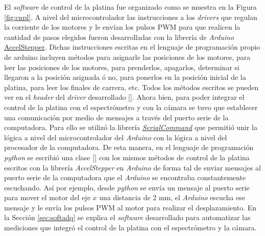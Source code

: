 El \textit{software} de control de la platina fue organizado como se muestra en la Figura \ref{fig:cnpl}. A nivel del microcontrolador las instrucciones a los \textit{drivers} que regulan la corriente de los motores y le envían los pulsos PWM para que realicen la cantidad de pasos elegidos fueron desarrolladas con la librería de \textit{Arduino} \href{https://www.airspayce.com/mikem/arduino/AccelStepper/}{AccelStepper}. Dichas instrucciones escritas en el lenguaje de programación propio de arduino incluyen métodos para asignarle las posiciones de los motores, para leer las posiciones de los motores, para prenderlos, apagarlos, determinar si llegaron a la posición asignada ó no, para ponerlos en la posición inicial de la platina, para leer los finales de carrera, etc. Todos los métodos escritos se pueden ver en el \textit{header} del \textit{driver} desarrollado [\href{https://github.com/jrr1984/open_frame_XYStage/tree/master/ino_main}{\faGithub}].
Ahora bien, para poder integrar el control de la platina con el espectrómetro y con la cámara se tuvo que establecer una comunicación por medio de mensajes a través del puerto serie de la computadora. Para ello se utilizó la librería \href{https://github.com/kroimon/Arduino-SerialCommand}{\textit{SerialCommand}} que permitió unir la lógica a nivel del microcontrolador del \textit{Arduino} con la lógica a nivel del procesador de la computadora. De esta manera, en el lenguaje de programación \textit{python} se escribió una clase [\href{https://github.com/jrr1984/open\_frame\_XYStage/blob/master/XYStage.py}{\faGithub}] con los mismos métodos de control de la platina escritos con la librería \textit{AccelStepper} en \textit{Arduino} de forma tal de enviar mensajes al puerto serie de la computadora que el \textit{Arduino} se encontraba constantemente escuchando. Así por ejemplo, desde \textit{python} se envía un mensaje al puerto serie para mover el motor del eje $\textit{x}$ una distancia de 2 mm, el \textit{Arduino} escucha ese mensaje y le envía los pulsos PWM al motor para realizar el desplazamiento. En la Sección \ref{sec:softadq} se explica el \textit{software} desarrollado para automatizar las mediciones que integró el control de la platina con el espectrómetro y la cámara.

